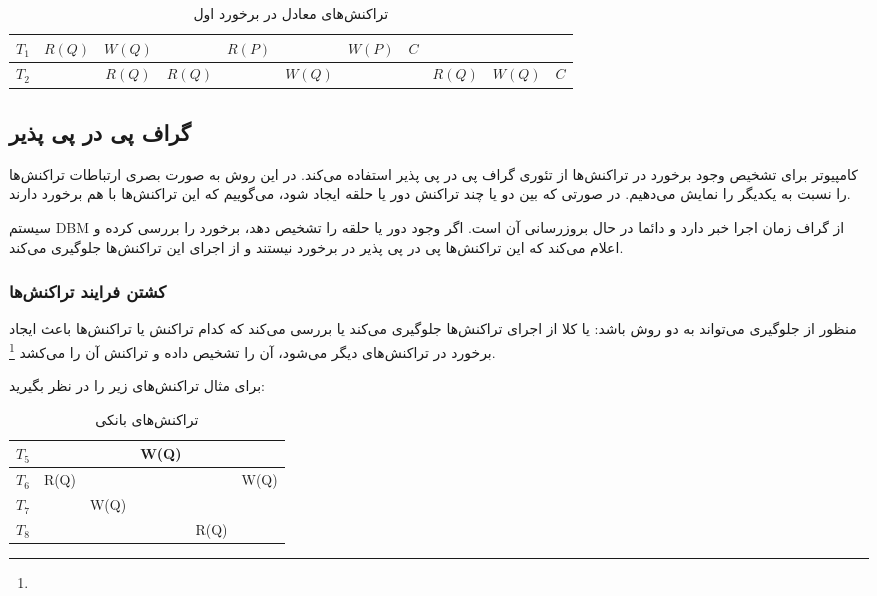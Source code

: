 \documentclass[a4paper]{article}
\begin{document}
\begin{LTR}
    \begin{table}[h]
        \centering
        \begin{RTL}
            \caption{تراکنش‌های معادل در برخورد اول}
        \end{RTL}
        \begin{tabular}{|c|c|c|c|c|c|c|c|c|c|c|}
            \hline
            $T_{1}$ & $R(Q)$ & $W(Q)$ & & $R(P)$ & & $W(P)$ & $C$ & & & \\ \hline
            $T_{2}$ & & $R(Q)$ & $R(Q)$ & & $W(Q)$ & &  & $R(Q)$ & $W(Q)$ & $C$ \\ \hline
        \end{tabular}
    \end{table}
\end{LTR}

\subsection{گراف پی در پی پذیر}

کامپیوتر برای تشخیص وجود برخورد در تراکنش‌ها از تئوری گراف پی در پی پذیر استفاده
می‌کند. در این روش به صورت بصری ارتباطات تراکنش‌ها را ‌نسبت به یکدیگر را نمایش
می‌دهیم. در صورتی که بین دو یا چند تراکنش دور یا حلقه ایجاد شود، می‌گوییم که این
تراکنش‌ها با هم برخورد دارند.

سیستم DBM از گراف زمان اجرا خبر دارد و دائما در حال بروزرسانی آن است. اگر وجود
دور یا حلقه را تشخیص دهد، برخورد را بررسی کرده و اعلام می‌کند که این تراکنش‌ها
پی در پی پذیر در برخورد نیستند و از اجرای این تراکنش‌ها جلوگیری می‌کند.

\subsubsection{کشتن فرایند تراکنش‌ها}

منظور از جلوگیری می‌تواند به دو روش باشد: یا کلا از اجرای تراکنش‌ها جلوگیری
می‌کند یا بررسی می‌کند که کدام تراکنش یا تراکنش‌ها باعث ایجاد برخورد در
تراکنش‌های دیگر می‌شود، آن را تشخیص داده و تراکنش آن را می‌کشد \footnote{}.

\newpage

برای مثال تراکنش‌های زیر را در نظر بگیرید:

\begin{LTR}
    \begin{table}[h]
        \centering
        \begin{RTL}
            \caption{تراکنش‌های بانکی}
        \end{RTL}
        \begin{tabular}{|c|c|c|c|c|c|}
            \hline
            $T_{5}$ & & & W(Q) & & \\ \hline
            $T_{6}$ & R(Q) & & & & W(Q) \\ \hline
            $T_{7}$ & & W(Q) & & & \\ \hline
            $T_{8}$ & & & & R(Q) & \\ \hline
        \end{tabular}
    \end{table}
\end{LTR}
\end{document}
